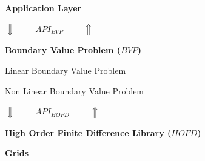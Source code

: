 \begin{framed}


\begin{framed}
{\Large{\textbf {Application Layer}}}\\
\end{framed}

\begin{centering}

\begin{Large}
\hfill $\Downarrow \hspace{1cm} API_{BVP} \hspace{1cm} \Uparrow$ \hfill
\end{Large}
\end{centering}

\begin{framed}
{\large{\textbf {Boundary Value Problem ($BVP$)}}}\\

\begin{multicols}{2}

\begin{framed}
Linear Boundary Value Problem
\end{framed}

\columnbreak

\begin{framed}
Non Linear Boundary Value Problem
\end{framed}


\end{multicols}

\end{framed}

\begin{centering}

\begin{large}
\hfill $\Downarrow \hspace{1cm} API_{HOFD} \hspace{1cm} \Uparrow$ \hfill
\end{large}
\end{centering}

\begin{framed}
{\large{\textbf {High Order Finite Difference Library ($HOFD$)}}}\\

\begin{multicols}{2}

\begin{framed}
{\large{\textbf{Grids}}}\\


\end{framed}
\end{multicols}
\end{framed}
\end{framed}

